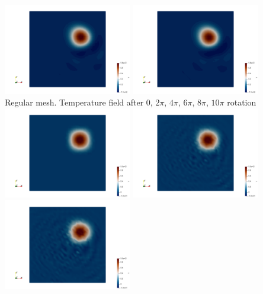 \begin{center}
\includegraphics[width=5.6cm]{python_codes/fieldstone_45/results/norandom/T.0004.png}
\includegraphics[width=5.6cm]{python_codes/fieldstone_45/results/norandom/T.0005.png}\\
{\captionfont Regular mesh. Temperature field after 0, $2\pi$, $4\pi$, $6\pi$, $8\pi$, $10\pi$ rotation}\\ 
\includegraphics[width=5.6cm]{python_codes/fieldstone_45/results/random/T.0000.png}
\includegraphics[width=5.6cm]{python_codes/fieldstone_45/results/random/T.0001.png}
\includegraphics[width=5.6cm]{python_codes/fieldstone_45/results/random/T.0002.png}\\

\end{center}
